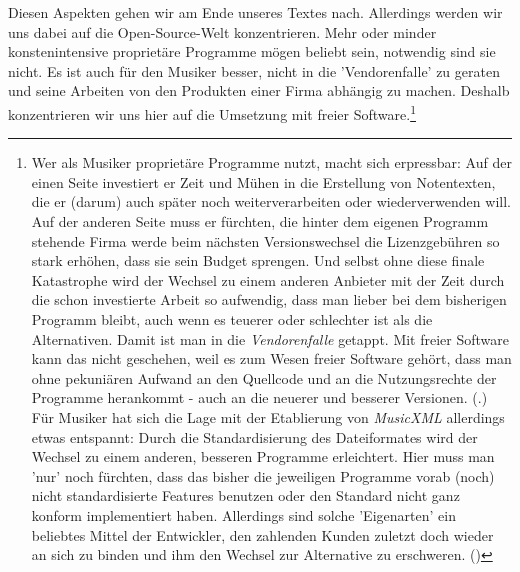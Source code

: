 Diesen Aspekten gehen wir am Ende unseres Textes nach. Allerdings werden wir uns
dabei auf die Open-Source-Welt konzentrieren. Mehr oder minder konstenintensive
proprietäre Programme mögen beliebt sein, notwendig sind sie nicht. Es ist auch
für den Musiker besser, nicht in die 'Vendorenfalle' zu geraten und seine
Arbeiten von den Produkten einer Firma abhängig zu machen. Deshalb konzentrieren
wir uns hier auf die Umsetzung mit freier Software.\footnote{Wer als Musiker
proprietäre Programme nutzt, macht sich erpressbar: Auf der einen Seite
investiert er Zeit und Mühen in die Erstellung von Notentexten, die er (darum)
auch später noch weiterverarbeiten oder wiederverwenden will. Auf der anderen
Seite muss er fürchten, die hinter dem eigenen Programm stehende Firma werde
beim nächsten Versionswechsel die Lizenzgebühren so stark erhöhen, dass sie sein
Budget sprengen. Und selbst ohne diese finale Katastrophe wird der Wechsel zu
einem anderen Anbieter mit der Zeit durch die schon investierte Arbeit so
aufwendig, dass man lieber bei dem bisherigen Programm bleibt, auch wenn es
teuerer oder schlechter ist als die Alternativen. Damit ist man in die
\textit{Vendorenfalle} getappt. Mit freier Software kann das nicht geschehen,
weil es zum Wesen freier Software gehört, dass man ohne pekuniären Aufwand an
den Quellcode und an die Nutzungsrechte der Programme herankommt - auch an die
neuerer und besserer Versionen. (\cite[vgl. dazu][\nopage wp]{FSF2018a}.) Für
Musiker hat sich die Lage mit der Etablierung von \textit{MusicXML} allerdings
etwas entspannt: Durch die Standardisierung des Dateiformates wird der Wechsel
zu einem anderen, besseren Programme erleichtert. Hier muss man 'nur' noch
fürchten, dass das bisher die jeweiligen Programme vorab (noch) nicht
standardisierte Features benutzen oder den Standard nicht ganz konform
implementiert haben. Allerdings sind solche 'Eigenarten' ein beliebtes Mittel
der Entwickler, den zahlenden Kunden zuletzt doch wieder an sich zu binden und
ihm den Wechsel zur Alternative zu erschweren. (\cite[Zur Lizenzierung von
MusicXML vgl. auch][\nopage wp.]{WpedMusicXML2018a})}


